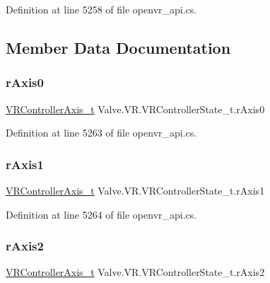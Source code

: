 Definition at line 5258 of file openvr\+\_\+api.\+cs.



\subsection{Member Data Documentation}
\mbox{\label{struct_valve_1_1_v_r_1_1_v_r_controller_state__t_a9734722addc3a96cc9e1039a05dd01be}} 
\subsubsection{\texorpdfstring{rAxis0}{rAxis0}}
{\footnotesize\ttfamily \mbox{\hyperlink{struct_valve_1_1_v_r_1_1_v_r_controller_axis__t}{V\+R\+Controller\+Axis\+\_\+t}} Valve.\+V\+R.\+V\+R\+Controller\+State\+\_\+t.\+r\+Axis0}



Definition at line 5263 of file openvr\+\_\+api.\+cs.

\mbox{\label{struct_valve_1_1_v_r_1_1_v_r_controller_state__t_aab2b63cf0d653dc00ac933bbc157c875}} 
\subsubsection{\texorpdfstring{rAxis1}{rAxis1}}
{\footnotesize\ttfamily \mbox{\hyperlink{struct_valve_1_1_v_r_1_1_v_r_controller_axis__t}{V\+R\+Controller\+Axis\+\_\+t}} Valve.\+V\+R.\+V\+R\+Controller\+State\+\_\+t.\+r\+Axis1}



Definition at line 5264 of file openvr\+\_\+api.\+cs.

\mbox{\label{struct_valve_1_1_v_r_1_1_v_r_controller_state__t_a3eac9961bd65cb3519fb4a0997e0ecc4}} 
\subsubsection{\texorpdfstring{rAxis2}{rAxis2}}
{\footnotesize\ttfamily \mbox{\hyperlink{struct_valve_1_1_v_r_1_1_v_r_controller_axis__t}{V\+R\+Controller\+Axis\+\_\+t}} Valve.\+V\+R.\+V\+R\+Controller\+State\+\_\+t.\+r\+Axis2}



